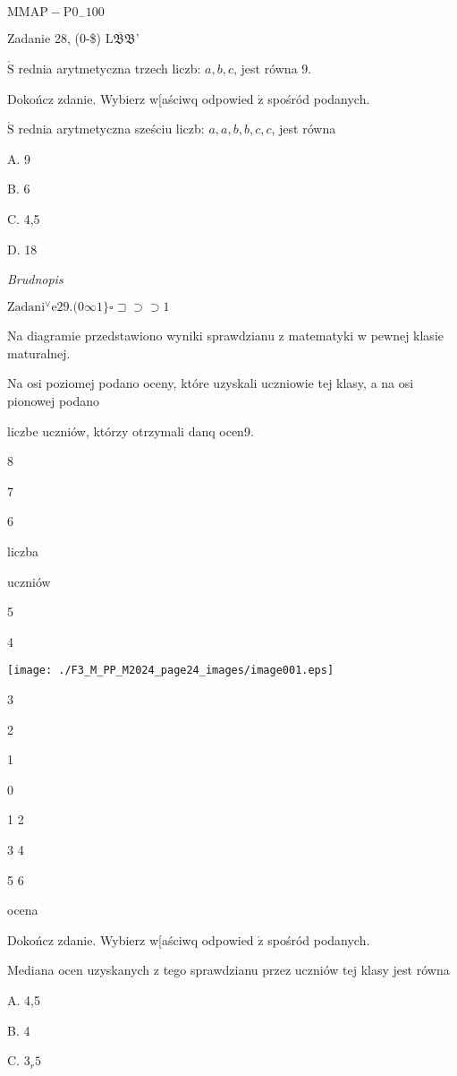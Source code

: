 \documentclass[a4paper,12pt]{article}
\begin{document}
$\mathrm{M}\mathrm{M}\mathrm{A}\mathrm{P}-\mathrm{P}0_{-}100$





Zadanie 28, (0-{\$}) $\overline{\mathrm{L}\mathfrak{B}\mathfrak{B}}$'

$\acute{\mathrm{S}}$ rednia arytmetyczna trzech liczb: $a, b, c$, jest równa 9.

Dokończ zdanie. Wybierz w[aściwq odpowied $\acute{\mathrm{z}}$ spośród podanych.

$\acute{\mathrm{S}}$ rednia arytmetyczna sześciu liczb: $a, a, b, b, c, c$, jest równa

A. 9

B. 6

C. 4,5

D. 18

{\it Brudnopis}

$\mathrm{Z}\mathrm{a}\mathrm{d}\mathrm{a}\mathrm{n}\mathrm{i}^{\vee}\mathrm{e}29. (0\infty 1\} \square \sqsupset\supset\supset 1$

Na diagramie przedstawiono wyniki sprawdzianu z matematyki w pewnej klasie maturalnej.

Na osi poziomej podano oceny, które uzyskali uczniowie tej klasy, a na osi pionowej podano

liczbe uczniów, którzy otrzymali danq ocen9.

8

7

6

liczba

uczniów

5

4
\begin{center}
\texttt{[image: ./F3\_M\_PP\_M2024\_page24\_images/image001.eps]}
\end{center}
3

2

1

0

1 2

3 4

5 6

ocena

Dokończ zdanie. Wybierz w[aściwq odpowied $\acute{\mathrm{z}}$ spośród podanych.

Mediana ocen uzyskanych z tego sprawdzianu przez uczniów tej klasy jest równa

A. 4,5

B. 4

C. $3_{r}5$
\end{document}
